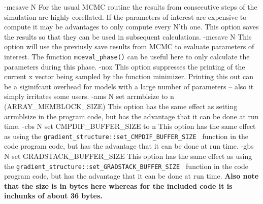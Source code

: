 \beginexample
 -mcsave N  
\endexample
For the usual MCMC routine the results from consecutive
steps of the simulation are highly corellated. If the
parameters of interest are expensive to compute it may be advantages to
only compute every N'th one. This option saves the results so that they
can be used in subsequent calculations.
\beginexample
 -mcsave N  
\endexample
{}
This option will use the previusly save results from MCMC to evaluate
parameters of interest. The function {\tt mceval\_phase()} can
be useful here to only calculate the parameters during this phase.
\beginexample
 -nox  
\endexample
This option suppresses the printing of the current x vector
being sampled by the function minimizer.
Printing this out can be a siginifcant overhead for models with
a large number of parameters -- also it simply irritates some users.
\beginexample
 -ams N          set arrmblsize to n (ARRAY_MEMBLOCK_SIZE) 
\endexample
This option has the same effect as setting arrmblsize in the
program code, but has the advantage that it can be done at run time.
\beginexample
 -cbs N          set CMPDIF_BUFFER_SIZE to n 
\endexample
This option has the same effect as using the 
\goodbreak
{\tt gradient\_structure::set\_CMPDIF\_BUFFER\_SIZE } function in the code 
program code, but has the advantage that it can be done at run time.
\beginexample
 -gbs N          set GRADSTACK_BUFFER_SIZE 
\endexample
This option has the same effect as using the \goodbreak
{\tt gradient\_structure::set\_GRADSTACK\_BUFFER\_SIZE } function in the code 
program code, but has the advantage that it can be done at run time. 
{\bf Also note that the size is in bytes here whereas for the included code it is inchunks of about 36 bytes.}

